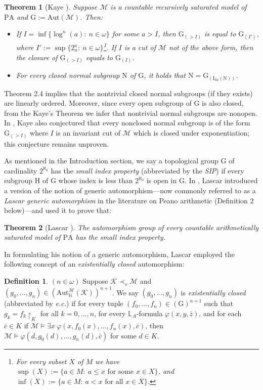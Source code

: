 \documentclass[11pt]{article}
\newtheorem{theorem}{Theorem}[section]
\theoremstyle{plain}
\theoremstyle{definition}
\newtheorem{dfn}{Definition}
\newcommand{\M}{\mathcal{M}}
\newcommand{\K}{\mathcal{K}}
\newcommand{\NN}{\mathbb{N}}
\newcommand{\I}{\mathrm{I_{fix}}}
\newcommand{\G}{\mathrm{G}}
\newcommand{\A}{\mathrm{Aut}}
\newcommand{\pa}{\mathrm{PA}}
\begin{document}
\begin{theorem}[Kaye \cite{k}]
	Suppose $ \M $ is a countable recursively saturated model of $ \pa $ and $\G:=\A(\M)$. Then:
		\begin{itemize}
			\item[(1)] If $I=\inf \{\log^{n}(a): \ n\in \omega\} $ for some $a>I$, then  $\G_{(>I)}$ is equal to  $\G_{(I')} $, where $ I':=\sup \{2_{n}^{a}: \ n\in \omega\}$\footnote{For every subset $X$ of $M$ we have	$\sup(X):=\{a\in M: \ a\leq x \text{ for some  } x\in X\}$, and $\inf(X):=\{a\in M: \ a< x \text{ for all  } x\in X\}$.}. If $I$ is a cut of $\M$  not of the above form, then the closure of $\G_{(>I)}$  equals to $\G_{(I)} $.
		\item[(2)] For every closed normal subgroup $\mathrm{N}$ of $\G$, it holds that $\mathrm{N}=\G_{(\I(\mathrm{N}))}$.
	\end{itemize} 
\end{theorem}
Theorem 2.4 implies that the nontrivial closed normal subgroups (if they exists) are linearly ordered. Moreover, since every open subgroup of $\G$ is also closed, from the Kaye's Theorem we infer  that nontrivial normal subgroups are nonopen.  In \cite{k}, Kaye also conjectured  that  every nonclosed normal subgroup is of the form $\G_{(>I)}$ where $I$ is an invariant cut of $\M$ which is closed under exponentiation; this conjecture remains unproven.

As mentioned in the Introduction section, we  say  a  topological group $ \G $ of cardinality $2^{\aleph_{0}}$ has the \textit{small index property} (abbreviated by the \textit{SIP}) if every subgroup $ \mathrm{H} $ of $\G$ whose index is less than $ 2^{\aleph_{0}} $ is open in $ \G $. In \cite{las}, Lascar introduced a version of the notion of generic automorphism---now commonly referred to as a \textit{Lascar generic automorphism} in the literature on Peano arithmetic (Definition 2 below)---and used it to prove that:
\begin{theorem}[Lascar \cite{las}]
	The automorphism group of every countable arithmetically saturated model of $ \pa $ has the small index property.
\end{theorem}
In formulating his notion of a generic automorphism, Lascar employed the following concept of an \textit{existentially closed} automorphism: 
\begin{dfn}
$(n\in\omega)$	Suppose $ \K\prec_{s}\M $ and $ (g_{0},...,g_{n})\in(\A_{\NN}^{\M}(\K))^{n+1} $. We  say $ (g_{0},...,g_{n}) $ is \textit{existentially closed} (abbreviated by \textit{e.c.}) if for every  tuple  $ {(f_{0},...,f_{n})\in(\G)^{n+1}} $ such that  $ g_{k}= f_{k}\upharpoonright_{K} $ for all $k=0,...,n$,  for every $\mathbb{L}_{A}$-formula $ \varphi(x,y,\bar{z}) $, and for each $ \bar{c}\in K $ if $ \M\models\exists x \ \varphi(x,f_{0}(x),...,f_{n}(x),\bar{c}) $, then $ \M\models\varphi(d,g_{0}(d),...,g_{n}(d),\bar{c}) $ for some $ d\in K $.
\end{dfn}
\end{document}
